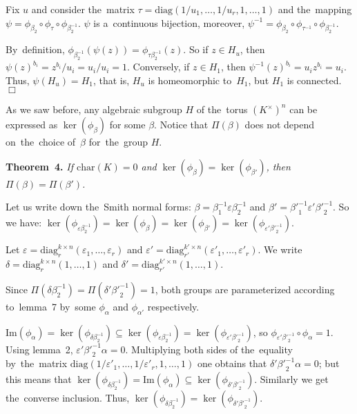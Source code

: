 \documentclass[twoside]{article}
\begin{document}
    Fix $u$ and consider the~matrix $\tau = \mathrm{diag}(1 / u_1, \ldots, 1 / u_r, 1, \ldots, 1)$
    and the~mapping $\psi = \phi_{\beta_2} \circ \phi_\tau \circ \phi_{\beta_2^{-1}}$.
    $\psi$ is a~continuous bijection, moreover, $\psi^{-1} = \phi_{\beta_2} \circ \phi_{\tau^{-1}} \circ \phi_{\beta_2^{-1}}$.

    By~definition, $\phi_{\beta_2^{-1}}(\psi(z)) = \phi_{\tau \beta_2^{-1}}(z)$. So if $z \in H_u$,
    then $\psi(z)^{b_i} = z^{b_i} / u_i = u_i / u_i = 1$. Conversely, if $z \in H_1$, then $\psi^{-1}(z)^{b_i} = u_i z^{b_i} = u_i$.
    Thus, $\psi(H_u) = H_1$, that is, $H_u$ is homeomorphic to~$H_1$, but $H_1$ is connected.
\hfill$\Box$\medskip

As we saw before, any algebraic subgroup $H$ of the~torus $(K^\times)^n$ can be expressed as $\ker(\phi_\beta)$
for some $\beta$. Notice that $\Pi(\beta)$ does not depend on~the~choice of~$\beta$ for~the~group $H$.

\medskip\noindent\textbf{Theorem~4.}\emph{
    If $\mathrm{char}(K) = 0$ and $\ker(\phi_{\beta}) = \ker(\phi_{\beta'})$, then $\Pi(\beta) = \Pi(\beta')$.
}\medskip

    Let us write down the~Smith normal forms: $\beta = \beta_1^{-1} \varepsilon \beta_2^{-1}$
    and $\beta' = {\beta'}_1^{-1} \varepsilon' {\beta'}_2^{-1}$. So we have: $\ker(\phi_{\varepsilon \beta_2^{-1}}) = \ker(\phi_{\beta}) = \ker(\phi_{\beta'}) = \ker(\phi_{\varepsilon' {\beta'}_2^{-1}})$.

    Let $\varepsilon = \mathrm{diag}^{k \times n}_r(\varepsilon_1, \ldots, \varepsilon_r)$
    and $\varepsilon' = \mathrm{diag}^{k' \times n}_{r'}(\varepsilon'_1, \ldots, \varepsilon'_r)$.
    We write $\delta = \mathrm{diag}^{k \times n}_r(1, \ldots, 1)$ and $\delta' = \mathrm{diag}^{k' \times n}_{r'}(1, \ldots, 1)$.

    Since $\Pi(\delta \beta_2^{-1}) = \Pi(\delta' {\beta'}_2^{-1}) = 1$, both groups are parameterized
    according to~lemma~7 by~some $\phi_\alpha$ and $\phi_{\alpha'}$ respectively.

    $\mathrm{Im}(\phi_\alpha) = \ker(\phi_{\delta \beta_2^{-1}}) \subseteq \ker(\phi_{\varepsilon \beta_2^{-1}}) = \ker(\phi_{\varepsilon' {\beta'}_2^{-1}})$,
    so $\phi_{\varepsilon' {\beta'}_2^{-1}} \circ \phi_\alpha = 1$. Using lemma~2, $\varepsilon' {\beta'}_2^{-1} \alpha = 0$.
    Multiplying both sides of the~equality by~the~matrix $\mathrm{diag}(1 / \varepsilon'_1, \ldots, 1 / \varepsilon'_r, 1, \ldots, 1)$
    one obtains that $\delta' {\beta'}_2^{-1} \alpha = 0$; but this means that $\ker(\phi_{\delta \beta_2^{-1}}) = \mathrm{Im}(\phi_\alpha) \subseteq \ker(\phi_{\delta' {\beta'}_2^{-1}})$.
    Similarly we get the~converse inclusion. Thus, $\ker(\phi_{\delta \beta_2^{-1}}) = \ker(\phi_{\delta' {\beta'}_2^{-1}})$.
\end{document}
